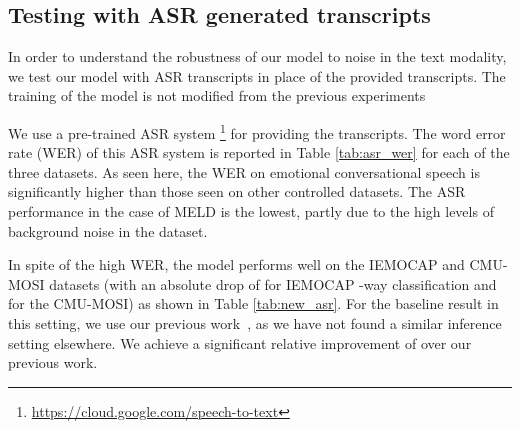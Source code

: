 \documentclass[lettersize,journal]{IEEEtran}
\begin{document}
\subsection{Testing with ASR generated transcripts}
In order to understand the robustness of our model to noise in the text modality, we test our model with ASR transcripts in place of the provided transcripts. The training of the model is not modified from the previous experiments


We use a pre-trained ASR system \footnote{\url{https://cloud.google.com/speech-to-text}\label{googlefoot}} for providing the transcripts. The word error rate (WER) of this ASR system  is reported  in Table \ref{tab:asr_wer} for each of the three datasets. As seen here, the WER on emotional conversational speech is significantly higher than those seen on other controlled datasets. The ASR performance in the case of MELD is the lowest, partly due to the high levels of background noise in the dataset.
\begin{table}[t!]
\caption{\label{tab:new_asr}Weighted F1 score of our system with ASR transcripts during test time on the datasets.}
\begin{center}
\end{center}
\end{table}
In spite of the high WER, the model performs well on the IEMOCAP and CMU-MOSI datasets (with an absolute drop of  for IEMOCAP -way classification and  for the CMU-MOSI) as shown in Table \ref{tab:new_asr}. For the baseline result in this setting, we use our previous work~\cite{dutta2022multimodal}, as we have not found a similar inference setting elsewhere.
We achieve a significant relative improvement of  over our previous work.
\end{document}
